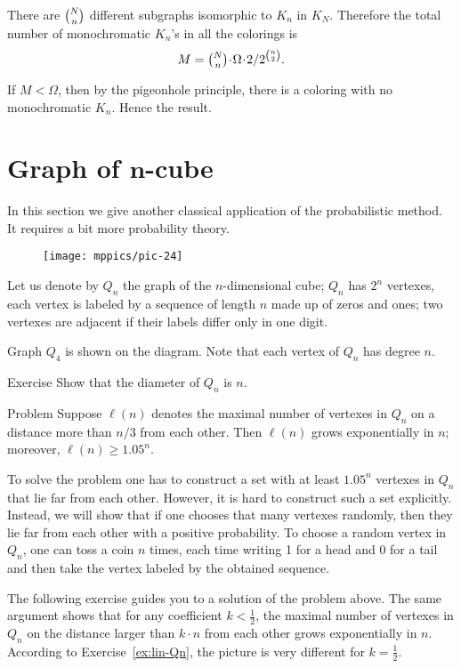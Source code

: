 There are $\tbinom Nn$ different subgraphs isomorphic to $K_n$ in $K_N$.
Therefore the total number of monochromatic $K_n$'s in all the colorings 
is 
\[M=\tbinom Nn\cdot\Omega\cdot  2/2^{\binom n2}.\]

If $M<\Omega$, then by the pigeonhole principle,
there is a coloring with no monochromatic $K_n$.
Hence the result.
\qeds

\section*{Graph of $\bm{n}$-cube}

In this section we give another classical application of the probabilistic method.
It requires a bit more probability theory. 

\begin{wrapfigure}{r}{25mm}
\vskip-0mm
\centering
\texttt{[image: mppics/pic-24]}
\vskip-0mm
\end{wrapfigure}

Let us denote by $Q_n$ the graph of the $n$-dimensional cube;
$Q_n$ has $2^n$ vertexes, each vertex is labeled by a sequence of length $n$ made up of zeros and ones;
two vertexes are adjacent if their labels differ only in one digit.

Graph $Q_4$ is shown on the diagram.
Note that each vertex of $Q_n$ has degree $n$.


\begin{thm}{Exercise}
Show that the diameter of $Q_n$ is $n$. 
\end{thm}


\begin{thm}{Problem}\label{prob:Qn}
Suppose $\ell(n)$ denotes the maximal number of vertexes in $Q_n$ on a distance more than $n/3$ from each other.
Then $\ell(n)$ grows exponentially in $n$;
moreover, $\ell(n)\ge 1.05^n$. 
\end{thm}

To solve the problem one has to construct a set with at least $1.05^n$ vertexes in $Q_n$ that lie far from each other.
However, it is hard to construct such a set explicitly.
Instead, we will show that if one chooses that many vertexes randomly, then they lie far from each other with a positive probability.
To choose a random vertex in $Q_n$, one can toss a coin $n$ times, each time writing 1 for a head and 0 for a tail and then take the vertex labeled by the obtained sequence.

The following exercise guides you to a solution of the problem above.
The same argument shows that for any coefficient $k<\tfrac12$, the maximal number of vertexes in $Q_n$ on the distance larger than $k\cdot n$ from each other grows exponentially in $n$.
According to Exercise~\ref{ex:lin-Qn}, the picture is very different for $k= \tfrac12$.

